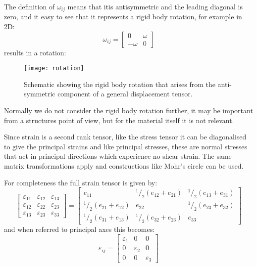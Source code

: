 The definition of $\omega_{ij}$ means that itis antisymmetric and the leading diagonal is zero, and it easy to see that it represents a rigid body rotation, for example in 2D:
\begin{equation}
\omega_{ij} = \begin{bmatrix}
0 & \omega \\
-\omega & 0 
\end{bmatrix}
\end{equation}
results in a rotation:
\FloatBarrier
\begin{figure}[h!]
\centering
\texttt{[image: rotation]}
\caption{Schematic showing the rigid body rotation that arises from the anti-symmetric component of a general displacement tensor.}
\end{figure}
\FloatBarrier


Normally we do not consider the rigid body rotation further, it may be important from a structures point of view, but for the material itself it is not relevant.

Since strain is a second rank tensor, like the stress tensor it can be diagonalised to give the principal strains and like principal stresses, these are normal stresses that act in principal directions which experience no shear strain. The same matrix transformations apply and constructions like Mohr's circle can be used.

For completeness the full strain tensor is given by:
\begin{equation}
\begin{bmatrix}
\varepsilon_{11} & \varepsilon_{12} & \varepsilon_{13} \\
\varepsilon_{12} & \varepsilon_{22} & \varepsilon_{23} \\
\varepsilon_{13} & \varepsilon_{23} & \varepsilon_{33}
\end{bmatrix}
=
\begin{bmatrix}
e_{11} & ^1\!/_2 (e_{12} + e_{21}) & ^1\!/_2 (e_{13} + e_{31}) \\
^1\!/_2 (e_{21} + e_{12}) & e_{22} & ^1\!/_2 (e_{23} + e_{32}) \\
^1\!/_2 (e_{31} + e_{13}) & ^1\!/_2 (e_{32} + e_{23}) & e_{33}
\end{bmatrix}
\end{equation}
and when referred to principal axes this becomes:
\begin{equation}
\varepsilon_{ij} = \begin{bmatrix}
\varepsilon_1 & 0 & 0 \\
0 & \varepsilon_2 & 0 \\
0 & 0 & \varepsilon_3
\end{bmatrix}
\end{equation}



